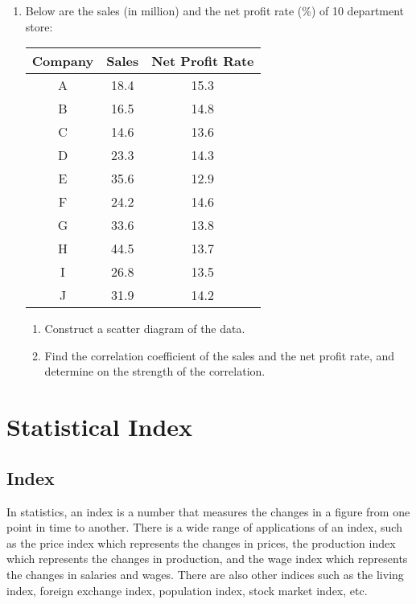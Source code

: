 \documentclass{report}
\begin{document}
\begin{multicols}{2}
\begin{enumerate}
    \item Below are the sales (in million) and the net profit rate (\%) of 10 department
          store:
          \begin{center}
            \begin{tabular}{|c|c|c|}
              \hline
              Company & Sales & Net Profit Rate \\
              \hline
              A       & 18.4  & 15.3            \\
              B       & 16.5  & 14.8            \\
              C       & 14.6  & 13.6            \\
              D       & 23.3  & 14.3            \\
              E       & 35.6  & 12.9            \\
              F       & 24.2  & 14.6            \\
              G       & 33.6  & 13.8            \\
              H       & 44.5  & 13.7            \\
              I       & 26.8  & 13.5            \\
              J       & 31.9  & 14.2            \\
              \hline
            \end{tabular}
          \end{center}
          \begin{enumerate}
            \item Construct a scatter diagram of the data.
            \item Find the correlation coefficient of the sales and the net profit rate, and
                  determine on the strength of the correlation.
          \end{enumerate}

  \end{enumerate}

  \section{Statistical Index}

  \subsection*{Index}

  In statistics, an index is a number that measures the changes in a figure from
  one point in time to another. There is a wide range of applications of an
  index, such as the price index which represents the changes in prices, the
  production index which represents the changes in production, and the wage index
  which represents the changes in salaries and wages. There are also other
  indices such as the living index, foreign exchange index, population index,
  stock market index, etc.


\end{multicols}
\end{document}
